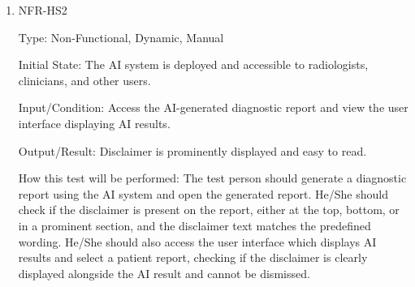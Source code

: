 \documentclass[12pt, titlepage]{article}
\begin{document}
\begin{enumerate}
\begin{enumerate}
\begin{enumerate}
\begin{enumerate}
\item{NFR-HS2\\}\label{NFR-HS2}

Type: Non-Functional, Dynamic, Manual

Initial State: The AI system is deployed and accessible to radiologists, clinicians, and other users.

Input/Condition: Access the AI-generated diagnostic report and view the user interface displaying AI results.

Output/Result: Disclaimer is prominently displayed and easy to read.

How this test will be performed: The test person should generate a diagnostic report using the AI system and open the generated report. He/She should check if the disclaimer is present on the report, either at the top, bottom, or in a prominent section, and the disclaimer text matches the predefined wording. He/She should also access the user interface which displays AI results and select a patient report, checking if the disclaimer is clearly displayed alongside the AI result and cannot be dismissed.

\end{enumerate}

\begin{landscape}

\end{landscape}
\end{enumerate}
\end{enumerate}
\end{enumerate}
\end{document}
